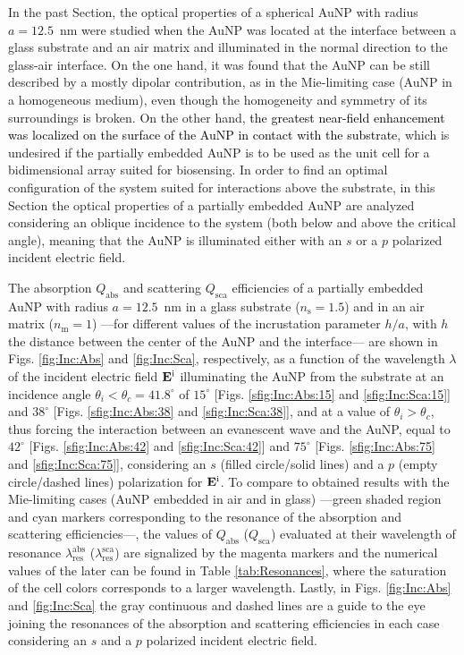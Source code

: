 
In the past Section, the optical properties of a spherical AuNP with radius $a = 12.5$~nm were studied when the AuNP was located at the interface between a glass substrate and an air matrix and illuminated in the normal direction to the glass-air interface. On the one hand, it was found that the AuNP can be still described by a mostly dipolar contribution, as in the Mie-limiting case (AuNP in a homogeneous medium), even though the homogeneity and symmetry of its surroundings is broken. On the other hand, \textcolor{black}{the greatest near-field enhancement was localized on  the surface of the AuNP in contact with the substrate}, which is undesired if the partially embedded AuNP is to be used as the unit cell for a bidimensional array suited for biosensing. In order to find an optimal configuration of the system suited for interactions above the substrate, in this Section the optical properties of a partially embedded AuNP are analyzed considering an oblique incidence to the system (both below and above the critical angle), meaning that the AuNP is illuminated either with an $s$ or a $p$ polarized incident electric field.

The absorption $Q_\text{abs}$ and scattering $Q_\text{sca}$ efficiencies of a partially embedded  AuNP with radius $a =12.5$~nm in a glass substrate ($n_\text{s} = 1.5$) and in an air matrix ($n_\text{m} = 1$) ---for different values of the incrustation parameter $h/a$, with $h$ the distance between the center of the AuNP and the interface--- are shown in Figs. \ref{fig:Inc:Abs} and \ref{fig:Inc:Sca}, respectively, as a function of the wavelength $\lambda$ of the incident electric field $\vb{E}^\text{i}$ illuminating the AuNP from the substrate at an incidence angle $\theta_i < \theta_c = 41.8^\circ$ of $15^\circ$ [Figs. \ref{sfig:Inc:Abs:15} and \ref{sfig:Inc:Sca:15}] and  $38^\circ$ [Figs. \ref{sfig:Inc:Abs:38} and \ref{sfig:Inc:Sca:38}], and  at a value of $\theta_i>\theta_c$, thus forcing the interaction between an evanescent wave and the AuNP, equal to $42^\circ$  [Figs. \ref{sfig:Inc:Abs:42} and \ref{sfig:Inc:Sca:42}] and $75^\circ$  [Figs. \ref{sfig:Inc:Abs:75} and \ref{sfig:Inc:Sca:75}], considering an $s$ (filled circle/solid lines) and a $p$ (empty circle/dashed lines) polarization for $\vb{E}^\text{i}$. To compare to obtained results with the Mie-limiting cases (AuNP embedded in air and in glass) ---green shaded region and cyan markers corresponding to the resonance of the absorption and scattering efficiencies---, the values of $Q_\text{abs}$ ($Q_\text{sca}$) evaluated at their wavelength of resonance $\lambda_\text{res}^\text{abs}$ ($\lambda_\text{res}^\text{sca}$) are signalized by the magenta markers and the numerical values of the later can be found in Table \ref{tab:Resonances}, where the saturation of the cell colors corresponds to a larger wavelength. Lastly, in Figs. \ref{fig:Inc:Abs} and \ref{fig:Inc:Sca} the gray continuous and dashed lines are a guide to the eye joining the resonances of the absorption and scattering efficiencies in each case considering an $s$ and a $p$ polarized incident electric field.

